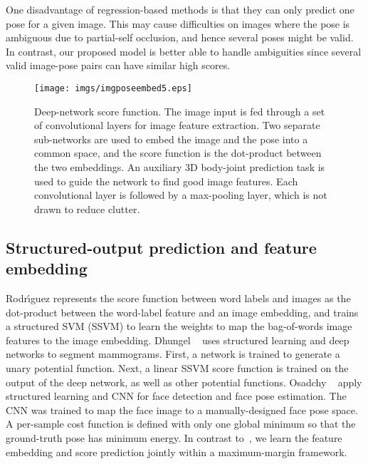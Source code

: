 \documentclass[10pt,twocolumn,letterpaper]{article}
\begin{document}
One disadvantage of regression-based methods is that they can only predict one pose for a given image.  This may cause difficulties on images where the pose is ambiguous due to partial-self occlusion, and hence several poses might be valid.
In contrast, our proposed model is better able to handle ambiguities since several valid image-pose pairs can have similar high scores.
 
\begin{figure*}[t]
\begin{center}  
   \texttt{[image: imgs/imgposeembed5.eps]}
\end{center}
\vspace{-0.1in}
   \caption{Deep-network score function.  The image input is fed through a set of convolutional layers for image feature extraction. Two separate sub-networks are used to embed the image and the pose into a common space, and the score function is the dot-product between the two embeddings.
An auxiliary 3D body-joint prediction task is used to guide the network to find good image features.
Each convolutional layer is followed by a max-pooling layer, which is not drawn to reduce clutter.}
\label{fig:imgposenet}
\vspace{-0.15in}
\end{figure*} 
 

   
\subsection{Structured-output prediction and feature embedding}
Rodr{\'{\i}}guez \cite{labelembed2013}
represents the score function between word labels and images as the dot-product between the word-label feature and an image embedding, and trains a structured SVM (SSVM) to learn the weights to map the bag-of-words image features to the image embedding.
Dhungel \etal~\cite{DhungelCB14} uses structured learning and deep networks to segment mammograms.  First, a network is trained to generate a unary potential function.
Next, a linear SSVM score function is trained on the output of the deep network, as well as other potential functions. 
Osadchy \etal~\cite{Osadchy:2007} apply structured learning and CNN %
for face detection and face pose estimation. 
The CNN %
was trained to map the face image to a manually-designed face pose space. A per-sample cost function is defined with only one global minimum so that the ground-truth pose has minimum energy.
In contrast to~\cite{DhungelCB14,labelembed2013,Osadchy:2007}, we learn the feature embedding and score prediction jointly within a maximum-margin framework. 
  
\end{document}
